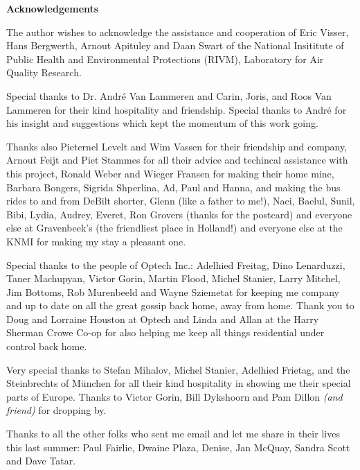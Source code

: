 \clearpage

\begin {Large}
\begin {center}
{\bf Acknowledgements}
\end {center}
\end {Large}
\vspace{1 cm}

The author wishes to acknowledge the assistance and cooperation
of Eric Visser, Hans Bergwerth, Arnout Apituley and Daan Swart of the 
National Insititute of Public Health and Environmental Protections (RIVM),
Laboratory for Air Quality Research.

Special thanks to Dr. Andr\'{e} Van Lammeren and Carin, Joris, and Roos 
Van Lammeren for their kind hospitality and friendship. Special thanks
to Andr\'{e} for his insight and suggestions which kept the momentum
of this work going. 

Thanks also Pieternel Levelt and Wim Vassen for their friendship and
company, Arnout Feijt and Piet Stammes for all their advice
and techincal assistance with this project, Ronald 
Weber and Wieger Fransen for making
their home mine, Barbara Bongers, Sigrida Shperlina, Ad, Paul and Hanna, 
and making the bus rides to and from DeBilt shorter, 
Glenn (like a father to me!), Naci, Baelul, Sunil, Bibi, Lydia, Audrey, 
Everet, Ron Grovers (thanks for the postcard) and everyone else
at Gravenbeek's (the friendliest place in Holland!) 
and everyone else at the KNMI for making my stay a pleasant one.

Special thanks to the people of Optech Inc.: 
Adelhied Freitag, Dino Lenarduzzi, Taner Machupyan,
Victor Gorin, Martin Flood, Michel
Stanier, Larry Mitchel, Jim Bottoms, Rob Murenbeeld and Wayne Sziemetat 
for keeping me company and up to date on all the great gossip back home,
away from home. Thank you to Doug and Lorraine Houston at Optech and
Linda and Allan at the Harry Sherman Crowe Co-op
for also helping me keep all things residential under control back home.

Very special thanks to Stefan Mihalov, Michel Stanier, 
Adelhied Frietag, and the Steinbrechts
of M{\"{u}}nchen for all their kind hospitality in showing me their
special parts of Europe. Thanks to Victor Gorin, Bill Dykshoorn and 
Pam Dillon {\em (and friend)} for dropping by.

Thanks to all the other folks who sent me email and let
me share in their lives this last summer: Paul Fairlie, 
Dwaine Plaza, Denise, Jan McQuay, Sandra Scott and Dave Tatar.

